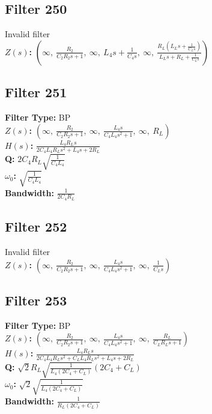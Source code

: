 \documentclass{article}
\begin{document}
\subsection*{Filter 250}
Invalid filter \\ 
\textbf{$Z(s)$:} $\left( \infty, \  \frac{R_{2}}{C_{2} R_{2} s + 1}, \  \infty, \  L_{4} s + \frac{1}{C_{4} s}, \  \infty, \  \frac{R_{L} \left(L_{L} s + \frac{1}{C_{L} s}\right)}{L_{L} s + R_{L} + \frac{1}{C_{L} s}}\right)$ \\ 
\subsection*{Filter 251}
\textbf{Filter Type:} BP \\ 
\textbf{$Z(s)$:} $\left( \infty, \  \frac{R_{2}}{C_{2} R_{2} s + 1}, \  \infty, \  \frac{L_{4} s}{C_{4} L_{4} s^{2} + 1}, \  \infty, \  R_{L}\right)$ \\ 
\textbf{$H(s)$:} $\frac{L_{4} R_{L} s}{2 C_{4} L_{4} R_{L} s^{2} + L_{4} s + 2 R_{L}}$ \\ 
\textbf{Q:} $2 C_{4} R_{L} \sqrt{\frac{1}{C_{4} L_{4}}}$ \\ 
\textbf{$\omega_0$:} $\sqrt{\frac{1}{C_{4} L_{4}}}$ \\ 
\textbf{Bandwidth:} $\frac{1}{2 C_{4} R_{L}}$ \\ 
\subsection*{Filter 252}
Invalid filter \\ 
\textbf{$Z(s)$:} $\left( \infty, \  \frac{R_{2}}{C_{2} R_{2} s + 1}, \  \infty, \  \frac{L_{4} s}{C_{4} L_{4} s^{2} + 1}, \  \infty, \  \frac{1}{C_{L} s}\right)$ \\ 
\subsection*{Filter 253}
\textbf{Filter Type:} BP \\ 
\textbf{$Z(s)$:} $\left( \infty, \  \frac{R_{2}}{C_{2} R_{2} s + 1}, \  \infty, \  \frac{L_{4} s}{C_{4} L_{4} s^{2} + 1}, \  \infty, \  \frac{R_{L}}{C_{L} R_{L} s + 1}\right)$ \\ 
\textbf{$H(s)$:} $\frac{L_{4} R_{L} s}{2 C_{4} L_{4} R_{L} s^{2} + C_{L} L_{4} R_{L} s^{2} + L_{4} s + 2 R_{L}}$ \\ 
\textbf{Q:} $\sqrt{2} R_{L} \sqrt{\frac{1}{L_{4} \left(2 C_{4} + C_{L}\right)}} \left(2 C_{4} + C_{L}\right)$ \\ 
\textbf{$\omega_0$:} $\sqrt{2} \sqrt{\frac{1}{L_{4} \left(2 C_{4} + C_{L}\right)}}$ \\ 
\textbf{Bandwidth:} $\frac{1}{R_{L} \left(2 C_{4} + C_{L}\right)}$ \\ 
\end{document}
